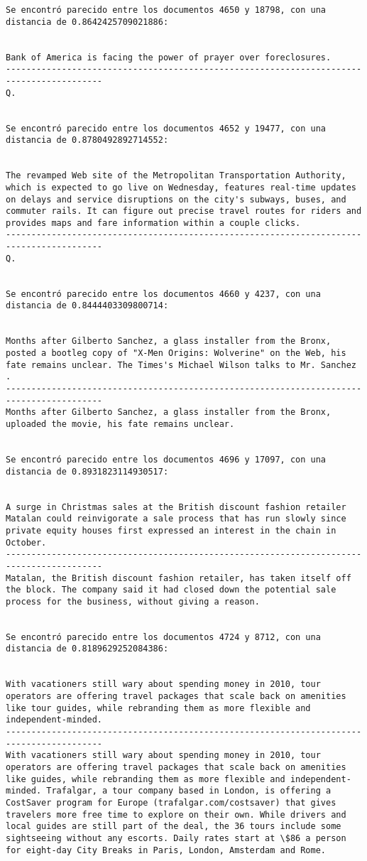 \documentclass[11pt]{article}
\begin{document}
\begin{Verbatim}[commandchars=\\\{\}]
Se encontró parecido entre los documentos 4650 y 18798, con una distancia de 0.8642425709021886:


Bank of America is facing the power of prayer over foreclosures.
-----------------------------------------------------------------------------------------
Q.


Se encontró parecido entre los documentos 4652 y 19477, con una distancia de 0.8780492892714552:


The revamped Web site of the Metropolitan Transportation Authority, which is expected to go live on Wednesday, features real-time updates on delays and service disruptions on the city's subways, buses, and commuter rails. It can figure out precise travel routes for riders and provides maps and fare information within a couple clicks.
-----------------------------------------------------------------------------------------
Q.


Se encontró parecido entre los documentos 4660 y 4237, con una distancia de 0.8444403309800714:


Months after Gilberto Sanchez, a glass installer from the Bronx, posted a bootleg copy of "X-Men Origins: Wolverine" on the Web, his fate remains unclear. The Times's Michael Wilson talks to Mr. Sanchez .
-----------------------------------------------------------------------------------------
Months after Gilberto Sanchez, a glass installer from the Bronx, uploaded the movie, his fate remains unclear.


Se encontró parecido entre los documentos 4696 y 17097, con una distancia de 0.8931823114930517:


A surge in Christmas sales at the British discount fashion retailer Matalan could reinvigorate a sale process that has run slowly since private equity houses first expressed an interest in the chain in October.
-----------------------------------------------------------------------------------------
Matalan, the British discount fashion retailer, has taken itself off the block. The company said it had closed down the potential sale process for the business, without giving a reason.


Se encontró parecido entre los documentos 4724 y 8712, con una distancia de 0.8189629252084386:


With vacationers still wary about spending money in 2010, tour operators are offering travel packages that scale back on amenities like tour guides, while rebranding them as more flexible and independent-minded.
-----------------------------------------------------------------------------------------
With vacationers still wary about spending money in 2010, tour operators are offering travel packages that scale back on amenities like guides, while rebranding them as more flexible and independent-minded. Trafalgar, a tour company based in London, is offering a CostSaver program for Europe (trafalgar.com/costsaver) that gives travelers more free time to explore on their own. While drivers and local guides are still part of the deal, the 36 tours include some sightseeing without any escorts. Daily rates start at \$86 a person for eight-day City Breaks in Paris, London, Amsterdam and Rome.



\end{Verbatim}
\end{document}
